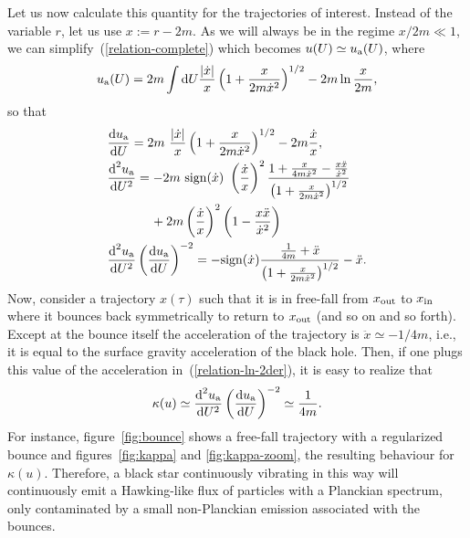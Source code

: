 \documentclass[11pt,a4paper]{article}
\newcommand{\diff}{\text{d}}
\begin{document}
Let us now calculate this quantity for the trajectories of interest. Instead of
the variable $r$, let us use $x:= r-2m$. As we will always be in the regime
$x/2m\ll 1$, we can simplify~(\ref{relation-complete}) which becomes $u(U) \simeq u_{\rm a} (U)$, where
%
\begin{align}
u_{\rm a}(U) = 2m \int   \diff U{|\dot x| \over x} \left(1 + {x \over 2m \dot x^2}\right)^{1/2} -2m\ln {x \over 2m},
\label{relation-ln}
\end{align}
%
so that
%
\begin{align}
&{\diff u_{\rm a} \over \diff U}= 2m~ {|\dot x| \over x} \left(1 + {x \over 2m \dot x^2}\right)^{1/2} -2m {\dot x \over x},
\label{relation-ln-1der}\\
&{\diff^2 u_{\rm a}  \over \diff U^2}= -2m~{\rm sign}(\dot x)~\left({\dot x \over x}\right)^2 {1 + {x \over 4m \dot x^2}- {x \ddot x \over \dot x^2} \over \left(1 + {x \over 2m \dot x^2}\right)^{1/2}}
\nonumber\\
&
\hspace{1.2 cm} +2m \left({\dot x \over x}\right)^2 \left( 1- {x \ddot x \over \dot x^2} \right)
\nonumber\\
&{\diff^2 u_{\rm a} \over \diff U^2} \left({\diff u_{\rm a} \over \diff U} \right)^{-2} = - {\rm sign}(\dot x){{1 \over 4m} + \ddot x \over \left(1 + {x \over 2m \dot x^2}\right)^{1/2}}  - \ddot x.
\label{relation-ln-2der}
\end{align}
%
Now, consider a trajectory $x(\tau)$ such that it is in free-fall from $x_{\rm
out}$ to $x_{\rm in}$ where it bounces back symmetrically to return to $x_{\rm
out}$ (and so on and so forth). Except at the bounce itself the acceleration of
the trajectory is $\ddot x \simeq -1/4m$, i.e., it is equal to the surface
gravity acceleration of the black hole. Then, if one plugs this value of the
acceleration in~(\ref{relation-ln-2der}), it is easy to realize that 
%
\begin{equation}
\kappa (u) \simeq {\diff^2 u_{\rm a} \over \diff U^2} \left({\diff u_{\rm a} \over \diff U}\right)^{-2} \simeq {1 \over 4m}. 
\end{equation}
%
 For instance, figure~\ref{fig:bounce}  shows a free-fall trajectory with a regularized bounce and figures~\ref{fig:kappa} and \ref{fig:kappa-zoom}, the resulting behaviour for $\kappa(u)$. Therefore, a black star continuously vibrating in this way will continuously emit a Hawking-like flux of particles with a Planckian spectrum, only contaminated by a small non-Planckian
emission associated with the bounces.
\end{document}
